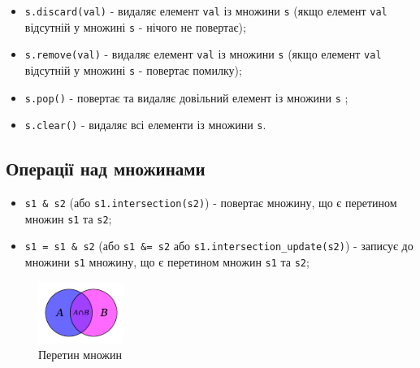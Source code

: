 \begin{frame}
\begin{itemize}

  \item \texttt{s.discard(val)} - видаляє елемент \texttt{val} із множини \texttt{s} (якщо елемент \texttt{val} відсутній у множині \texttt{s} - нічого не повертає);
  \item \texttt{s.remove(val)} - видаляє елемент \texttt{val} із множини \texttt{s} (якщо елемент \texttt{val} відсутній у множині \texttt{s} - повертає помилку);
  \item \texttt{s.pop()} - повертає та видаляє довільний елемент із множини \texttt{s} ;
  \item \texttt{s.clear()} - видаляє всі елементи із множини \texttt{s}.
\end{itemize}

\end{frame}

 \subsection{Операції над множинами} 
\begin{frame}
\begin{itemize}
  \item \texttt{s1 \& s2} (або \texttt{s1.intersection(s2)}) - повертає множину, що є перетином множин \texttt{s1} та \texttt{s2};
  \item \texttt{s1 = s1 \& s2} (або \texttt{s1 \&= s2} або \texttt{s1.intersection\_update(s2)}) - записує до множини \texttt{s1} множину, що є перетином множин \texttt{s1} та \texttt{s2};
  \end{itemize}
 \begin{figure}
\begin{center}
 \includegraphics[width=0.25\textwidth]{pictures/intersection.png}
\caption{Перетин множин}
\label{intersection} 
\end{center}
\end{figure} 
  
\end{frame}

